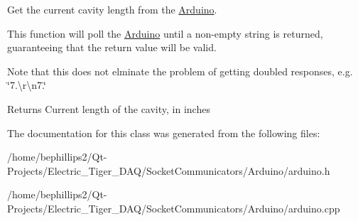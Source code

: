 Get the current cavity length from the \hyperlink{class_arduino}{Arduino}. 

This function will poll the \hyperlink{class_arduino}{Arduino} until a non-\/empty string is returned, guaranteeing that the return value will be valid.

Note that this does not elminate the problem of getting \textquotesingle{}doubled\textquotesingle{} responses, e.\+g. \char`\"{}7.\textbackslash{}r\textbackslash{}n7.\char`\"{}

\begin{DoxyReturn}{Returns}
Current length of the cavity, in inches 
\end{DoxyReturn}


The documentation for this class was generated from the following files\+:\begin{DoxyCompactItemize}
\item 
/home/bephillips2/\+Qt-\/\+Projects/\+Electric\+\_\+\+Tiger\+\_\+\+D\+A\+Q/\+Socket\+Communicators/\+Arduino/arduino.\+h\item 
/home/bephillips2/\+Qt-\/\+Projects/\+Electric\+\_\+\+Tiger\+\_\+\+D\+A\+Q/\+Socket\+Communicators/\+Arduino/arduino.\+cpp\end{DoxyCompactItemize}
